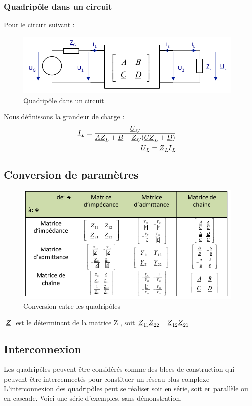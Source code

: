 \documentclass[12pt,a4paper]{article}
\newcommand{\uz}{\uline{Z} }
\newcommand{\ui}{\uline{I} }
\newcommand{\uu}{\uline{U} }
\newcommand{\ua}{\uline{A} }
\newcommand{\ub}{\uline{B} }
\newcommand{\uc}{\uline{C} }
\newcommand{\ud}{\uline{D} }
\begin{document}
\subsubsection{Quadripôle dans un circuit}
Pour le circuit suivant :
\begin{figure}[!h]
	\centering
	\includegraphics[scale=0.7]{images/chaine_grandeur}
	\caption{Quadripôle dans un circuit}
\end{figure}

Nous définissons la grandeur de charge :
\begin{align}
\ui_L = \frac{\uu_G}{\ua\uz_L +  \ub + \uz_G(\uc\uz_L + \ud)}\\
\uu_L = \uz_L\ui_L
\end{align}
\subsection[Conversion de paramètres des quadripôles]{Conversion de paramètres}
\begin{figure}[!h]
	\centering
	\includegraphics[scale=0.9]{images/conversion}
	\caption{Conversion entre les quadripôles}
\end{figure}
\begin{blackbox}
	 $|\uz|$ est le déterminant de la matrice \uz, soit $\uz_{11}\uz_{22} - \uz_{12}\uz_{21}$
\end{blackbox}
\subsection[Interconnexion des quadripôles]{Interconnexion}
Les quadripôles peuvent être considérés comme des blocs de construction qui peuvent être interconnectés pour constituer un réseau plus complexe. L’interconnexion des quadripôles peut se réaliser soit en série, soit en parallèle ou en cascade. Voici une série d'exemples, sans démonstration.
\end{document}
